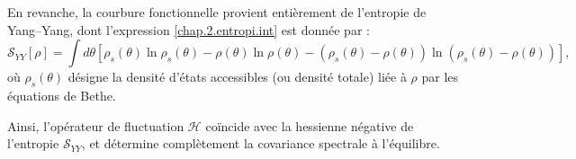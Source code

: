 En revanche, la courbure fonctionnelle provient entièrement de l'entropie de Yang–Yang, dont l’expression \eqref{chap.2.entropi.int} est donnée par :
\[
\mathcal{S}_{YY}[\rho] = \int d\theta \left[
\rho_s(\theta) \ln \rho_s(\theta) - \rho(\theta) \ln \rho(\theta) - (\rho_s(\theta) - \rho(\theta)) \ln(\rho_s(\theta) - \rho(\theta))
\right],
\]
où \(\rho_s(\theta)\) désigne la densité d’états accessibles (ou densité totale) liée à \(\rho\) par les équations de Bethe.

Ainsi, l’opérateur de fluctuation \(\mathcal{H}\) coïncide avec la hessienne négative de l'entropie \(\mathcal{S}_{YY}\), et détermine complètement la covariance spectrale à l’équilibre.



%
%




